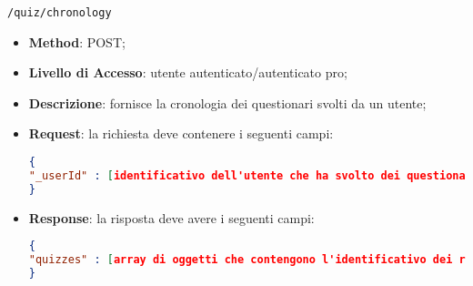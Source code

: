 	\item \texttt{/quiz/chronology}
		\begin{itemize}
			\item \textbf{Method}: POST;
			\item \textbf{Livello di Accesso}: utente autenticato/autenticato pro;
			\item \textbf{Descrizione}: fornisce la cronologia dei questionari svolti da un utente;
			\item \textbf{Request}: la richiesta deve contenere i seguenti campi:
\begin{lstlisting}[language=json,firstnumber=1]
{
"_userId" : [identificativo dell'utente che ha svolto dei questionari]
}
\end{lstlisting}
			\item \textbf{Response}: la risposta deve avere i seguenti campi:
\begin{lstlisting}[language=json,firstnumber=1]
{
"quizzes" : [array di oggetti che contengono l'identificativo dei riepiloghi dei questionari svolti]
}
\end{lstlisting} 
		\end{itemize}